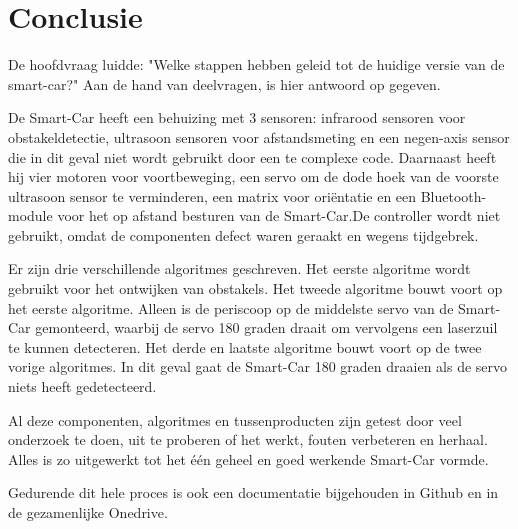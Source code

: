 \section{Conclusie}
De hoofdvraag luidde: "Welke stappen hebben geleid tot de huidige versie van de smart-car?"
Aan de hand van deelvragen, is hier antwoord op gegeven. 

\begin{comment}
Zo beschikt de \gls{Smart-Car} van een behuizing met 3 verschillende sensoren. De infrarood sensoren worden gebruikt om te bepalen of er een obstakel in de weg staat, de ultrasoon sensoren worden gebruikt om de afstand tot een object te bepalen, de negen-axis sensor wordt gebruikt om de \gls{Smart-Car} recht te houden. Ook heeft de \gls{Smart-Car} vier motoren om zich mee te verplaatsen en een servo om de dode hoek van de voorste ultrasoon sensor te verkleinen. Verder zit er nog een matrix op de achterkant van de auto die dient om de oriëntatie richting weer te geven. Tenslotte is er ook een \gls{Bluetooth}-module gemonteerd op de auto, waarmee op afstand besturen mogelijk wordt gemaakt. 
\end{comment}

De \gls{Smart-Car} heeft een behuizing met 3 sensoren: infrarood sensoren voor obstakeldetectie, ultrasoon sensoren voor afstandsmeting en een negen-axis sensor die in dit geval niet wordt gebruikt door een te complexe code. Daarnaast heeft hij vier motoren voor voortbeweging, een servo om de dode hoek van de voorste ultrasoon sensor te verminderen, een matrix voor oriëntatie en een Bluetooth-module voor het op afstand besturen van de \gls{Smart-Car}.De controller wordt niet gebruikt, omdat de componenten defect waren geraakt en wegens tijdgebrek.

Er zijn drie verschillende algoritmes geschreven. Het eerste algoritme wordt gebruikt voor het ontwijken van obstakels. Het tweede algoritme bouwt voort op het eerste algoritme. Alleen is de periscoop op de middelste servo van de \gls{Smart-Car} gemonteerd, waarbij de servo 180 graden draait om vervolgens een laserzuil te kunnen detecteren. Het derde en laatste algoritme bouwt voort op de twee vorige algoritmes. In dit geval gaat de \gls{Smart-Car} 180 graden draaien als de servo niets heeft gedetecteerd.

Al deze componenten, algoritmes en tussenproducten zijn getest door veel onderzoek te doen, uit te proberen of het werkt, fouten verbeteren en herhaal. Alles is zo uitgewerkt tot het één geheel en goed werkende \gls{Smart-Car} vormde. 

 Gedurende dit hele proces is ook een documentatie bijgehouden in Github en in de gezamenlijke Onedrive. 
